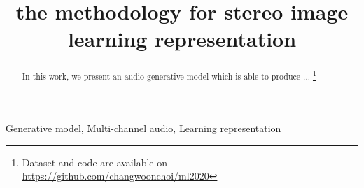 \documentclass{article}
\title{the methodology for stereo image learning representation}
\begin{document}
\maketitle

\begin{abstract}
In this work, we present an audio generative model which is able to produce ... 
\footnote{Dataset and code are available on \url{https://github.com/changwoonchoi/ml2020}}
\end{abstract}

\begin{keywords}
Generative model, Multi-channel audio, Learning representation
\end{keywords}









\end{document}
